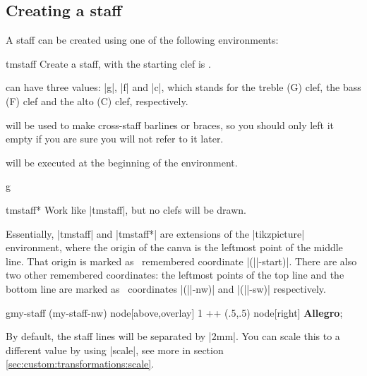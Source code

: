 \subsection{Creating a staff}\label{sec:init:staff-creation}
A staff can be created using one of the following environments:
\begin{environment}{{tmstaff}}
  Create a staff, with the starting clef is .

   can have three values: |g|, |f| and |c|, which stands for 
  the treble (G) clef, the bass (F) clef and the alto (C) clef, respectively.

   will be used to make cross-staff barlines or braces, so 
  you should only left it empty if you are sure you will not refer to it later.

   will be executed at the beginning of the environment.
\end{environment}
\begin{codeexample}[]
\begin{tmline}[staff offset=1cm]
\begin{tmstaff}{g}{}\end{tmstaff}
\end{tmline}
\end{codeexample}
\begin{environment}{{tmstaff*}}
  Work like |{tmstaff}|, but no clefs will be drawn.
\end{environment}
Essentially, |{tmstaff}| and |{tmstaff*}| are extensions of the 
|{tikzpicture}| environment, where the origin of the canva is the leftmost 
point of the middle line. That origin is marked as \tikzname\ remembered 
coordinate |(||-start)|. There are also two other remembered 
coordinates: the leftmost points of the top line and the bottom line are marked 
as \tikzname\ coordinates |(||-nw)| and |(||-sw)| 
respectively.
\begin{codeexample}[]
\begin{tmline}
\begin{tmstaff}{g}{my-staff}
  \path (my-staff-nw) node[above,overlay] {1} ++ (.5,.5) node[right] {\bfseries Allegro};
\end{tmstaff}
\end{tmline}
\end{codeexample}
By default, the staff lines will be separated by |2mm|. You can scale this to 
a different value by using |scale|, see more in section \ref{sec:custom:transformations:scale}.

